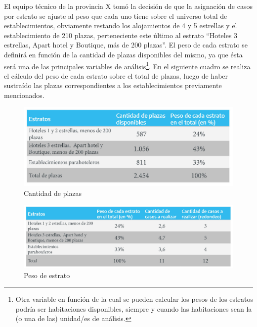 \documentclass[
]{book}
\begin{document}
El equipo técnico de la provincia X tomó la decisión de que la asignación de casos por estrato se ajuste al peso que cada uno tiene sobre el universo total de establecimientos, obviamente restando los alojamientos de 4 y 5 estrellas y el establecimiento de 210 plazas, perteneciente este último al estrato ``Hoteles 3 estrellas, Apart hotel y Boutique, más de 200 plazas''. El peso de cada estrato se definirá en función de la cantidad de plazas disponibles del mismo, ya que ésta será una de las principales variables de análisis\footnote{Otra variable en función de la cual se pueden calcular los pesos de los estratos podría ser habitaciones disponibles, siempre y cuando las habitaciones sean la (o una de las) unidad/es de análisis.}. En el siguiente cuadro se realiza el cálculo del peso de cada estrato sobre el total de plazas, luego de haber sustraído las plazas correspondientes a los establecimientos previamente mencionados.

\begin{figure}

{\centering \includegraphics[width=1\linewidth]{imagenes/tabla_2A} 

}

\caption{Cantidad de plazas}\label{fig:cantidad-de-plazas}
\end{figure}

\begin{figure}

{\centering \includegraphics[width=1\linewidth]{imagenes/tabla_2B} 

}

\caption{Peso de estrato}\label{fig:peso-de-estrato}
\end{figure}
\end{document}
